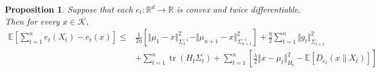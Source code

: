 \documentclass{article}
\theoremstyle{plain}
\newtheorem{proposition}[theorem]{Proposition}
\theoremstyle{definition}
\theoremstyle{plain}
\newcommand{\R}{\mathbb R}
\newcommand{\tr}{\operatorname{tr}}
\newcommand{\norm}[1]{\Vert #1 \Vert}
\newcommand{\E}{\mathbb E}
\newcommand{\cK}{\mathcal K}
\begin{document}
\begin{proposition}
    \label{prop:hermite-ons:master}
    Suppose that each $e_t:\R^d\to\R$ is convex and twice differentiable.
    Then for every $x\in\cK$,
    \begin{align}
        \E\left[
            \sum_{t=1}^{n}
            e_t(X_t) - e_t(x)
            \right]
        \leq
         & \frac{1}{2\eta}
        \left[
        \norm{\mu_1-x}_{\Sigma_1^{-1}}^2
        -
        \norm{\mu_{n+1}-x}_{\Sigma_{n+1}^{-1}}^2
        \right]
        +\frac{\eta}{2}\sum_{t=1}^n\norm{g_t}_{\Sigma_{t+1}}^2
        \\
         &
        +\sum_{t=1}^n\tr(H_t\Sigma_t)
        +\sum_{t=1}^n
        \left[
            \frac{\lambda}{2}\norm{x-\mu_t}_{H_t}^2
            - \E[D_{e_t}(x\|X_t)]
            \right]
        \label{eq:hermite-ons:master}
    \end{align}
\end{proposition}
\end{document}
